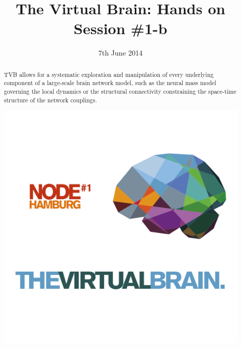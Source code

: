 \documentclass{tufte-handout}
\title{The Virtual Brain: Hands on Session \#1-b}
\date{7th June 2014}
\begin{document}
\maketitle %

\begin{abstract}

\noindent TVB allows for a systematic exploration and manipulation of every
underlying component of a large-scale brain network model, such as the neural
mass model governing the local dynamics or the structural connectivity
constraining the space-time structure of the network couplings.
\begin{marginfigure}%
  \includegraphics[width=\linewidth]{tvb_logo_transparent_square}
  \label{fig:marginfig}
\end{marginfigure}
\end{abstract}


\end{document}
